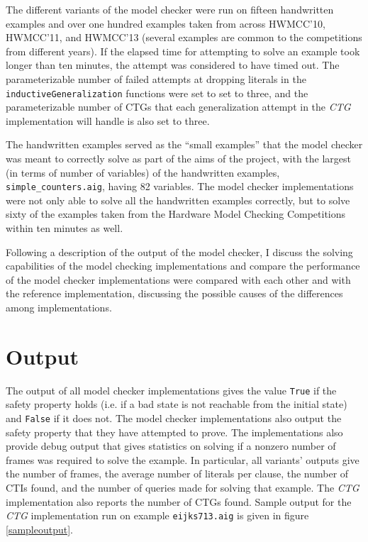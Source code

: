 \documentclass[12pt,a4paper,twoside,openright]{report}
\begin{document}
{The different variants of the model checker were run on fifteen handwritten examples
and over one hundred examples taken from across HWMCC'10, HWMCC'11, and HWMCC'13
(several examples are common to the competitions from different years).
If the elapsed time for attempting to solve an example took longer than ten minutes, the
attempt was considered to have timed out. The parameterizable number of failed attempts
at dropping literals in the \verb,inductiveGeneralization, functions were set to set to
three, and the parameterizable number of CTGs that each generalization attempt
in the {\it CTG} implementation will handle is also set to three.

The handwritten examples served as the ``small examples'' that the model checker
was meant to correctly solve as part of the aims of the project, with the largest
(in terms of number of variables) of the handwritten examples,
\verb,simple_counters.aig,, having 82 variables. The model checker
implementations were not only able to solve all the handwritten examples correctly,
but to solve sixty of the examples taken from the Hardware Model Checking Competitions
within ten minutes as well.

Following a description of the output of the model checker,
I discuss the solving capabilities of the model checking implementations and compare
the performance of the model checker implementations were compared with each other
and with the reference implementation, discussing the possible causes of the
differences among implementations.


\section{Output}

The output of all model checker implementations gives the value \verb,True, if the safety
property holds (i.e. if a bad state is not reachable from the initial state) and
\verb,False, if it does not. The model checker implementations also output the safety property
that they have attempted to prove. The implementations also provide debug output that gives
statistics on solving if a nonzero number of frames was required to solve the example.
In particular, all variants' outputs give the number of frames, the average number of
literals per clause, the number of CTIs found, and the number of queries made for solving
that example. The {\it CTG} implementation also reports the number of CTGs found. Sample output
for the {\it CTG} implementation run on example \verb,eijks713.aig,
is given in figure \ref{sampleoutput}.

}
\end{document}
